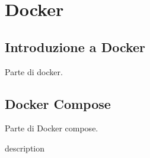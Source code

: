 \chapter{Docker} \label{ch:docker}

\section{Introduzione a Docker} 

Parte di docker.

\section{Docker Compose}

Parte di Docker compose.

description \cite{noms2020}